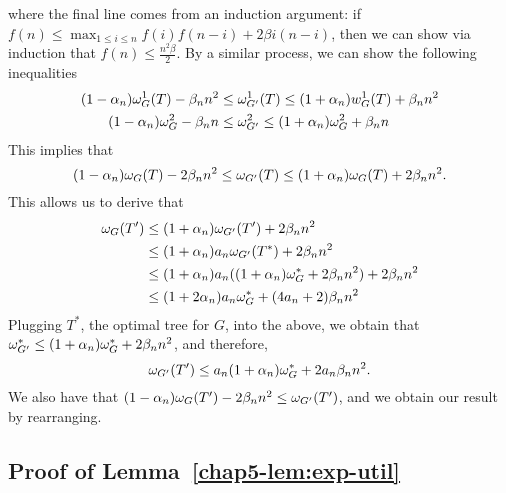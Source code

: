     where the final line comes from an induction argument: if $f(n) \leq \max_{1 \leq i \leq n} f(i)f(n-i) + 2\beta i(n-i)$, then we can show via induction that $f(n) \leq \frac{n^2\beta}{2}$. By a similar process, we can show the following inequalities
    \begin{align}
    (1-\alpha_n) \omega_{G}^1(T) - \beta_n n^2 &\leq \omega_{G'}^1(T) \leq (1+\alpha_n) w_G^1(T) + \beta_n n^2 \label{chap5-eq:cost-decomp1}\\
    (1-\alpha_n) \omega_{G}^2 - \beta_n n &\leq \omega_{G'}^2 \leq (1+\alpha_n) \omega_{G}^2 + \beta_n n \label{chap5-eq:cost-decomp2}
    \end{align}
    This implies that
    \[
        (1-\alpha_n) \omega_{G}(T) - 2\beta_n n^2 \leq \omega_{G'}(T) \leq (1+\alpha_n) \omega_{G}(T) + 2\beta_n n^2.
    \]
    This allows us to derive that
    \begin{align*}
        \omega_G(T') &\leq (1+\alpha_n)\omega_{G'}(T') + 2\beta_n n^2 \\
        &\leq (1+\alpha_n) a_n \omega_{G'}(T^*) + 2\beta_n n^2 \\
        &\leq (1+\alpha_n) a_n ((1+\alpha_n) \omega_{G}^* + 2\beta_n n^2) + 2\beta_n n^2 \\
        &\leq (1+2\alpha_n) a_n \omega_{G}^* + (4a_n + 2) \beta_n n^2
    \end{align*}
    Plugging $T^*$, the optimal tree for $G$, into the above, we obtain that $\omega_{G'}^* \leq (1+\alpha_n)\omega_{G}^* + 2\beta_n n^2$, and therefore,
    \[
        \omega_{G'}(T') \leq a_n (1+\alpha_n) \omega_G^* + 2 a_n \beta_n n^2.
    \]
    We also have that $(1-\alpha_n) \omega_{G}(T') - 2\beta_n n^2 \leq \omega_{G'}(T')$, and we obtain our result by rearranging. 

\subsection{Proof of Lemma~\ref{chap5-lem:exp-util}}

